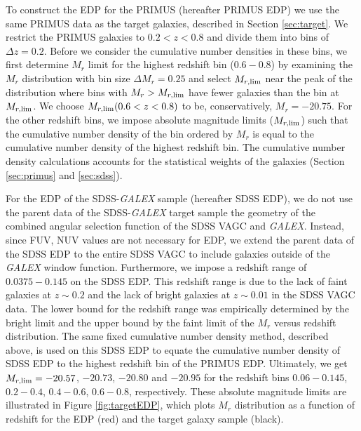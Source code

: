 \documentclass{emulateapj}
\begin{document}
To construct the EDP for the PRIMUS (hereafter PRIMUS EDP) we use the same PRIMUS data as the 
target galaxies, described in Section \ref{sec:target}. 
We restrict the PRIMUS galaxies to $0.2 < z < 0.8$ and divide them into bins of $\Delta z = 0.2$. 
Before we consider the cumulative number densities in these bins, we first determine $M_r$ limit for the 
highest redshift bin ($0.6-0.8$) by examining the $M_{r}$ distribution with bin size $\Delta M_{r} = 0.25$ 
and select $M_{r,\rm{lim}}$ near the peak of the distribution where bins with $M_{r} > M_{r,\rm{lim}}$ 
have fewer galaxies than the bin at $M_{r, \rm{lim}}$. 
We choose $M_{r, \rm{lim}}(0.6 < z < 0.8)$ to be, conservatively, $M_{r} = -20.75$. 
For the other redshift bins, we impose absolute magnitude limits ($M_{r,\rm{lim}}$) such 
that the cumulative number density of the bin ordered by $M_{r}$ is equal to the cumulative 
number density of the highest redshift bin. 
The cumulative number density calculations accounts for the statistical weights of the galaxies (Section 
\ref{sec:primus} and \ref{sec:sdss}).

For the EDP of the SDSS-{\em GALEX} sample (hereafter SDSS EDP), we do not use the parent data of 
the SDSS-{\em GALEX} target sample the geometry of the combined angular selection function of the 
SDSS VAGC and {\em GALEX}. 
Instead, since FUV, NUV values are not necessary for EDP, we extend the parent data of the SDSS EDP
to the entire SDSS VAGC to include galaxies outside of the {\em GALEX} window function. 
Furthermore, we impose a redshift range of $0.0375-0.145$ on the SDSS EDP. 
This redshift range is due to the lack of faint galaxies at $z \sim 0.2$ and the lack of bright galaxies at 
$z \sim 0.01$ in the SDSS VAGC data.  
The lower bound for the redshift range was empirically determined by the bright limit and the upper bound 
by the faint limit of the $M_{r}$ versus redshift distribution. 
The same fixed cumulative number density method, described above, is used on this SDSS EDP to equate
the cumulative number density of SDSS EDP to the highest redshift bin of the PRIMUS EDP. 
Ultimately, we get $M_{r,\rm{lim}} = -20.57$, $-20.73$, $-20.80$ and $-20.95$ for the redshift bins $0.06-0.145$, 
$0.2-0.4$, $0.4-0.6$, $0.6-0.8$, respectively.  %
These absolute magnitude limits are illustrated in Figure \ref{fig:targetEDP}, which plots $M_{r}$ distribution as 
a function of redshift for the EDP (red) and the target galaxy sample (black). 
\end{document}
